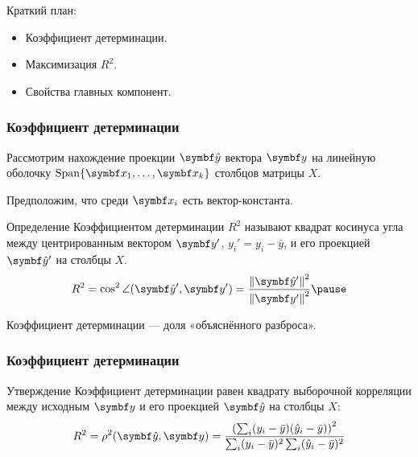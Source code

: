 
\begin{frame} %


\end{frame}



\begin{frame}{Краткий план:}
  \begin{itemize}[<+->]
    \item Коэффициент детерминации.
    \item Максимизация $R^2$.
    \item Свойства главных компонент.
  \end{itemize}

\end{frame}




\begin{frame}
  \frametitle{Коэффициент детерминации}

  
  Рассмотрим нахождение проекции $\bhy$ вектора $\by$ на
  линейную оболочку $\Span\{ \bx_1, \ldots, \bx_k\}$ столбцов матрицы $X$. \pause

  Предположим, что среди $\bx_i$ есть вектор-константа. \pause 

  \begin{block}{Определение}
    \alert{Коэффициентом детерминации $R^2$} называют квадрат косинуса угла 
    между центрированным вектором $\by'$, $y_i' = y_i - \bar y$,
    и его проекцией $\bhy'$ на столбцы $X$.
    \[
      R^2 = \cos^2 \angle(\bhy', \by') = \frac{\norm{\bhy'}^2}{\norm{\by'}^2} \pause
    \]
  \end{block}

  Коэффициент детерминации — доля «объяснённого разброса». 

\end{frame}

\begin{frame}
\frametitle{Коэффициент детерминации}

  \begin{block}{Утверждение}
  Коэффициент детерминации равен 
    квадрату выборочной корреляции между исходным $\by$ и его проекцией $\bhy$ на столбцы $X$:
    \[
      R^2 = \rho^2 (\bhy, \by) = \frac{\left( \sum_i (y_i - \bar y) (\hat y_i - \bar y) \right)^2}{\sum_i (y_i - \bar y)^2 \sum_i (\hat y_i - \bar y)^2 }
    \]
  \end{block}

\end{frame}




